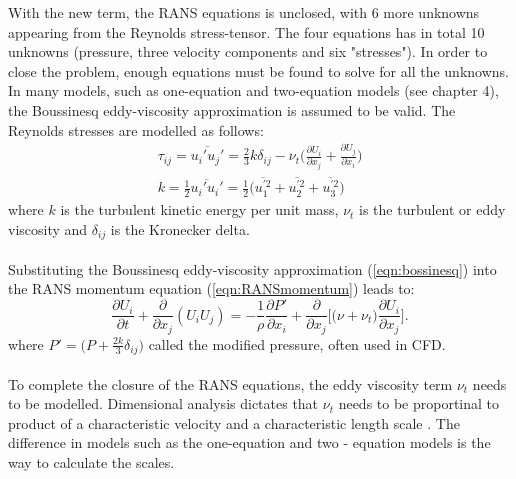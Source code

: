 \documentclass[a4paper, 12pt]{report}
\begin{document}
With the new term, the RANS equations is unclosed, with 6 more unknowns appearing from the Reynolds stress-tensor. The four equations has in total 10 unknowns (pressure, three velocity components and six "stresses"). In order to close the problem, enough equations must be found to solve for all the unknowns. In many models, such as one-equation and two-equation models (see \citep{Wilcox} chapter 4), the Boussinesq eddy-viscosity approximation \citep{CFD} is assumed to be valid. The Reynolds stresses are modelled as follows:
\begin{eqnarray}
\label{eqn:bossinesq}
\tau_{ij} = \overline{u_i'u_j'} = \frac{2}{3}k\delta_{ij} - \nu_t\big(\frac{\partial U_i}{\partial x_j} + \frac{\partial U_j}{\partial x_i}\big)\\
\label{eqn:TurbKineticEnergy}
k = \frac{1}{2}\overline{u_i' u_i'} = \frac{1}{2}\big(\overline{u_1^{'2}} + \overline{u_2^{'2}} + \overline{u_3^{'2}} \big)
\end{eqnarray}
where $k$ is the turbulent kinetic energy per unit mass, $\nu_t$ is the turbulent or eddy viscosity and $\delta_{ij}$ is the Kronecker  delta.\\
\\
Substituting the Boussinesq eddy-viscosity approximation (\ref{eqn:bossinesq}) into the RANS momentum equation (\ref{eqn:RANSmomentum}) leads to:
\begin{equation}
\frac{\partial U_i}{\partial t} +  \frac{\partial}{\partial x_j}(U_i U_j) = -\frac{1}{\rho} \frac{\partial P'}{\partial x_i} +  \frac{\partial}{\partial x_j}\Big[ \big(\nu + \nu_t\big) \frac{\partial U_i}{\partial x_j}\Big].
\end{equation}
where $P' = \big(P + \frac{2k}{3}\delta_{ij} \big)$ called the modified pressure\cite{Pope}, often used in CFD.\\
\\
To complete the closure of the RANS equations, the eddy viscosity term $\nu_t$ needs to be modelled. Dimensional analysis dictates that $\nu_t$ needs to be proportinal to product of a characteristic velocity and a characteristic length scale \cite{Wilcox,AppliedMathematicalModelling}. The difference in models such as the one-equation and two - equation models is the way to calculate the scales. 
\end{document}
